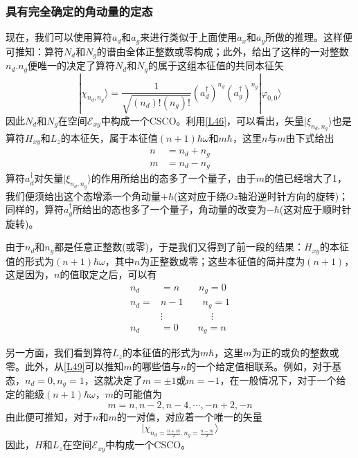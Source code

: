 \documentclass[]{article}
\begin{document}
\subsubsection{具有完全确定的角动量的定态}
现在，我们可以使用算符$a_d$和$a_g$来进行类似于上面使用$a_x$和$a_y$所做的推理。这样便可推知：算符$N_d$和$N_g$的谱由全体正整数或零构成；此外，给出了这样的一对整数${n_d.n_g}$便唯一的决定了算符$N_d$和$N_g$的属于这组本征值的共同本征矢
\begin{equation}
	|\chi_{n_d,n_g}\rangle=\dfrac{1}{\sqrt{(n_d)!(n_g)!}}(a_d^\dagger)^{n_d}(a_g^\dagger)^{n_g}|\varphi_{0,0}\rangle
\end{equation}
因此$N_d$和$N_g$在空间$\mathscr{E}_{xy}$中构成一个CSCO。利用\eqref{L46}，可以看出，矢量$|\xi_{n_d,n_g}\rangle$也是算符$H_{xy}$和$L_z$的本征矢，属于本征值$(n+1)\hbar\omega$和$m\hbar$，这里$n$与$m$由下式给出
\begin{align}
	n&=n_d+n_g\nonumber\\
	m&=n_d-n_g
\end{align}
算符$a_d^\dagger$对矢量$|\xi_{n_d,n_g}\rangle$的作用所给出的态多了一个量子，由于$m$的值已经增大了1，我们便须给出这个态增添一个角动量$+\hbar$(这对应于绕$Oz$轴沿逆时针方向的旋转)；同样的，算符$a_g^\dagger$所给出的态也多了一个量子，角动量的改变为$-\hbar$(这对应于顺时针旋转)。\par 
由于$n_d$和$n_g$都是任意正整数(或零)，于是我们又得到了前一段的结果：$H_{xy}$的本征值的形式为$(n+1)\hbar\omega$，其中$n$为正整数或零；这些本征值的简并度为$(n+1)$，这是因为，$n$的值取定之后，可以有
\begin{align}
	n_d&=n\quad\quad n_g=0\nonumber\\
	n_d=&n-1\quad\quad n_g=1\nonumber\\
	&\vdots\quad\quad\quad\quad\quad\vdots\nonumber\\
	n_d&=0\quad\quad n_g=n
	\label{L49}
\end{align}

另一方面，我们看到算符$L_z$的本征值的形式为$m\hbar$，这里$m$为正的或负的整数或零。此外，从\eqref{L49}可以推知$m$的哪些值与$n$的一个给定值相联系。例如，对于基态，$n_d=0,n_g=1$，这就决定了$m=\pm 1$或$m=-1$，在一般情况下，对于一个给定的能级$(n+1)\hbar\omega$，$m$的可能值为
\begin{equation}
	m=n,n-2,n-4,\cdots,-n+2,-n
\end{equation}
由此便可推知，对于$n$和$m$的一对值，对应着一个唯一的矢量
\begin{equation}
	|\chi_{n_d=\frac{n+m}{2},n_g=\frac{n-m}{2}}\rangle
\end{equation}
因此，$H$和$L_z$在空间$\mathscr{E}_{xy}$中构成一个CSCO。
\end{document}
